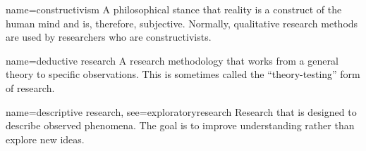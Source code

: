 






{name={constructivism}}
{%
	A philosophical stance that reality is a construct of the human mind and is, therefore, subjective. Normally, qualitative research methods are used by researchers who are constructivists.
}

{name={deductive research}}
{%
	A research methodology that works from a general theory to specific observations. This is sometimes called the ``theory-testing'' form of research.
}

{name={descriptive research},
 see={exploratoryresearch}}
{%
	Research that is designed to describe observed phenomena. The goal is to improve
	understanding rather than explore new ideas.
}


